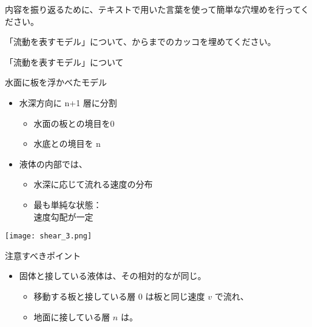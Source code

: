 \documentclass[uplatex,dvipdfmx,a4paper,11pt]{jsarticle}
\begin{document}
内容を振り返るために、テキストで用いた言葉を使って簡単な穴埋めを行ってください。
\begin{qlist}
	\qitem 「流動を表すモデル」について、からまでのカッコを埋めてください。
		\vspace{5mm}
		\begin{qlist2}
			\qitem 「流動を表すモデル」について
			\begin{center}
				\begin{minipage}{0.4\textwidth}
					\begin{itembox}[l]{水面に板を浮かべたモデル}
						\begin{itemize}
							\item 水深方向に n+1 層に分割
								\begin{itemize}
									\item 水面の板との境目を0
									\item 水底との境目を n 
								\end{itemize}
								\item 液体の内部では、
								\begin{itemize}
									\item 水深に応じて流れる速度の分布
									\item 最も単純な状態：\\速度勾配が一定
								\end{itemize}
						\end{itemize}
					\end{itembox}
				\end{minipage}
				\begin{minipage}{0.45\textwidth}
					\begin{center}
					\texttt{[image: shear\_3.png]}
					\end{center}
				\end{minipage}
				\begin{minipage}{0.9\textwidth}
					\begin{center}
					\begin{itembox}[l]{注意すべきポイント}
						\begin{itemize}
							\item 固体と接している液体は、その相対的な\qbox{}が同じ。
							\begin{itemize}
								\item 移動する板と接している層 0 は板と同じ速度 $v$ で流れ、
								\item 地面に接している層 $n$ は\qbox{}。
							\end{itemize}

\end{itemize}
\end{itembox}
\end{center}
\end{minipage}
\end{center}
\end{qlist2}
\end{qlist}
\end{document}
